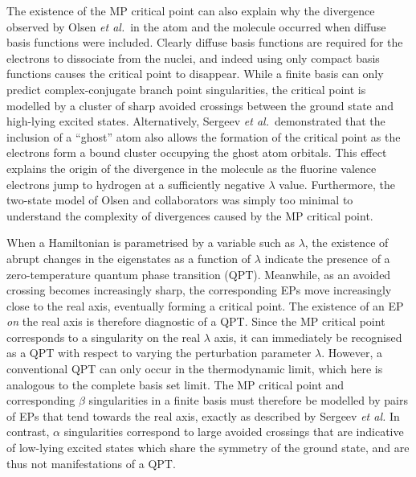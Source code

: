 \documentclass[aps,prb,reprint,noshowkeys,superscriptaddress]{revtex4-1}
\newcommand{\etal}{\textit{et al.}}
\begin{document}
The existence of the MP critical point can also explain why the divergence observed by Olsen \etal\ in the  atom 
and the  molecule occurred when diffuse basis functions were included.\cite{Olsen_1996}
Clearly diffuse basis functions are required for the electrons to dissociate from the nuclei, and indeed using
only compact basis functions causes the critical point to disappear.
While a finite basis can only predict complex-conjugate branch point singularities, the critical point is modelled
by a cluster of sharp avoided crossings between the ground state and high-lying excited states.\cite{Sergeev_2005}
Alternatively, Sergeev \etal\ demonstrated that the inclusion of a ``ghost'' atom also
allows the formation of the critical point as the electrons form a bound cluster occupying the ghost atom orbitals.\cite{Sergeev_2005}
This effect explains the origin of the divergence in the  molecule as the fluorine valence electrons jump to hydrogen at
 a sufficiently negative $\lambda$ value.\cite{Sergeev_2005}
Furthermore, the two-state model of Olsen and collaborators \cite{Olsen_2000} was simply too minimal to understand the complexity of 
divergences caused by the MP critical point.

When a Hamiltonian is parametrised by a variable such as $\lambda$, the existence of abrupt changes in the 
eigenstates as a function of $\lambda$ indicate the presence of a zero-temperature quantum phase transition (QPT).%
\cite{Heiss_1988,Heiss_2002,Borisov_2015,Sindelka_2017,CarrBook,Vojta_2003,SachdevBook,GilmoreBook} 
Meanwhile, as an avoided crossing becomes increasingly sharp, the corresponding EPs move increasingly close to the real axis, eventually forming a critical point.
The existence of an EP \emph{on} the real axis is therefore diagnostic of a QPT.\cite{Cejnar_2005, Cejnar_2007a}
Since the MP critical point corresponds to a singularity on the real $\lambda$ axis, it can immediately be
recognised as a QPT with respect to varying the perturbation parameter $\lambda$.
However, a conventional QPT can only occur in the thermodynamic limit, which here is analogous to the complete 
basis set limit.\cite{Kais_2006}
The MP critical point and corresponding $\beta$ singularities in a finite basis must therefore be modelled by pairs of EPs
that tend towards the real axis, exactly as described by Sergeev \etal\cite{Sergeev_2005}
In contrast, $\alpha$ singularities correspond to large avoided crossings that are indicative of low-lying excited
states which share the symmetry of the ground state,\cite{Goodson_2004} and are thus not manifestations of a QPT.
\end{document}
